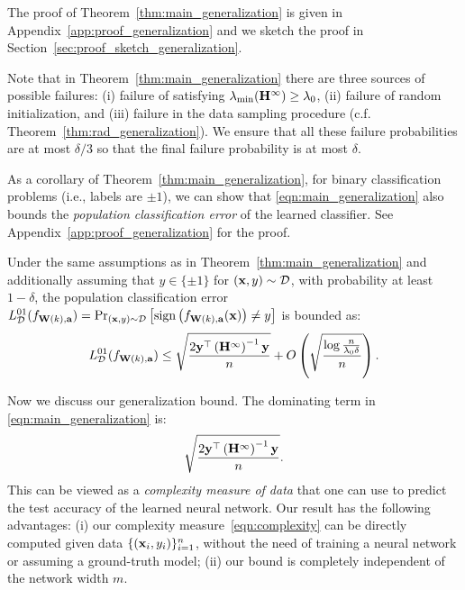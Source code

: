 The proof of Theorem~\ref{thm:main_generalization} is given in Appendix~\ref{app:proof_generalization} and we sketch the proof in Section~\ref{sec:proof_sketch_generalization}.

Note that in Theorem~\ref{thm:main_generalization} there are three sources of possible failures: (i) failure of satisfying $\lambda_{\min}(\mathbf{H}^\infty) \ge \lambda_0$, (ii) failure of random initialization, and (iii) failure in the data sampling procedure (c.f. Theorem~\ref{thm:rad_generalization}). We ensure that all these failure probabilities are at most $\delta/3$ so that the final failure probability is at most $\delta$.


As a corollary of Theorem~\ref{thm:main_generalization}, for binary classification problems (i.e., labels are $\pm1$), we can show that \eqref{eqn:main_generalization} also bounds the \emph{population classification error} of the learned classifier. 
See Appendix~\ref{app:proof_generalization} for the proof.
\begin{cor} \label{cor:binary-classification-generalization}
	Under the same assumptions as in Theorem~\ref{thm:main_generalization} and additionally assuming that $y\in\{\pm1\}$ for $(\mathbf{x}, y)\sim\mathcal{D}$, with probability at least $1-\delta$, the population classification error $L_{\mathcal{D}}^{01}(f_{\mathbf{W}(k), \mathbf{a}}) = \Pr_{(\mathbf{x}, y)\sim\mathcal{D}}\left[ \mathrm{sign}\left(f_{\mathbf{W}(k), \mathbf{a}}(\mathbf{x}) \right) \not= y \right]$ is bounded as:
	\begin{equation*} 
	L_{\mathcal{D}}^{01}(f_{\mathbf{W}(k), \mathbf{a}})  \le \sqrt{\frac{2\mathbf{y}^\top \left(\mathbf{H}^{\infty}\right)^{-1}\mathbf{y}}{n}}  + O\left( \sqrt{\frac{\log\frac{n}{\lambda_0\delta}}{n}} \right) .
	\end{equation*}
\end{cor}

Now we discuss our generalization bound.
The dominating term in \eqref{eqn:main_generalization} is:
\begin{equation}
\sqrt{\frac{ 2 \mathbf{y}^\top \left(\mathbf{H}^\infty\right)^{-1}\mathbf{y} }{n}}. \label{eqn:complexity}
\end{equation}
This can be viewed as a \emph{complexity measure of data} that one can use to predict the test accuracy of the learned neural network.
Our result has the following advantages:
(i) our complexity measure~\eqref{eqn:complexity} can be directly computed given data $\{(\mathbf{x}_i, y_i)\}_{i=1}^n$, without the need of training a neural network or assuming a ground-truth model;
(ii) our bound is completely independent of the network width $m$.

